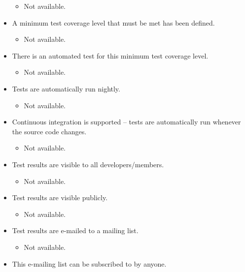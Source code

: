 \begin{itemize}
  \begin{itemize}
  \itemsep1pt\parskip0pt
  \item
    Not available.
  \end{itemize}
\item
  A minimum test coverage level that must be met has been defined.

  \begin{itemize}
  \itemsep1pt\parskip0pt
  \item
    Not available.
  \end{itemize}
\item
  There is an automated test for this minimum test coverage level.

  \begin{itemize}
  \itemsep1pt\parskip0pt
  \item
    Not available.
  \end{itemize}
\item
  Tests are automatically run nightly.

  \begin{itemize}
  \itemsep1pt\parskip0pt
  \item
    Not available.
  \end{itemize}
\item
  Continuous integration is supported -- tests are automatically run
  whenever the source code changes.

  \begin{itemize}
  \itemsep1pt\parskip0pt
  \item
    Not available.
  \end{itemize}
\item
  Test results are visible to all developers/members.

  \begin{itemize}
  \itemsep1pt\parskip0pt
  \item
    Not available.
  \end{itemize}
\item
  Test results are visible publicly.

  \begin{itemize}
  \itemsep1pt\parskip0pt
  \item
    Not available.
  \end{itemize}
\item
  Test results are e-mailed to a mailing list.

  \begin{itemize}
  \itemsep1pt\parskip0pt
  \item
    Not available.
  \end{itemize}
\item
  This e-mailing list can be subscribed to by anyone.


\end{itemize}
